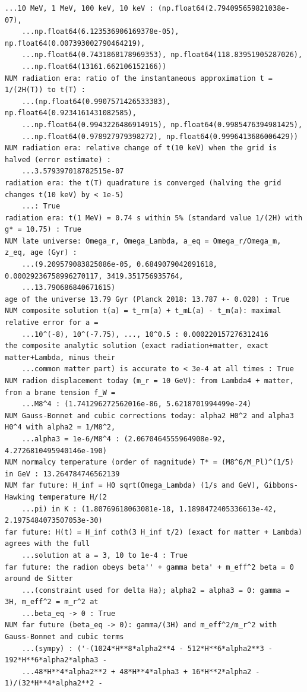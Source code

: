 \documentclass[10pt,a4paper]{article}
\begin{document}
\begin{Verbatim}[fontsize=\small,frame=single,framesep=2mm]
    ...10 MeV, 1 MeV, 100 keV, 10 keV : (np.float64(2.794095659821038e-07),
    ...np.float64(6.123536906169378e-05), np.float64(0.007393002790464219),
    ...np.float64(0.7431868178969353), np.float64(118.83951905287026),
    ...np.float64(13161.662106152166))
NUM radiation era: ratio of the instantaneous approximation t = 1/(2H(T)) to t(T) :
    ...(np.float64(0.9907571426533383), np.float64(0.9234161431082585),
    ...np.float64(0.9943226486914915), np.float64(0.9985476394981425),
    ...np.float64(0.978927979398272), np.float64(0.9996413686006429))
NUM radiation era: relative change of t(10 keV) when the grid is halved (error estimate) :
    ...3.579397018782515e-07
radiation era: the t(T) quadrature is converged (halving the grid changes t(10 keV) by < 1e-5)
    ...: True
radiation era: t(1 MeV) = 0.74 s within 5% (standard value 1/(2H) with g* = 10.75) : True
NUM late universe: Omega_r, Omega_Lambda, a_eq = Omega_r/Omega_m, z_eq, age (Gyr) :
    ...(9.209579083825086e-05, 0.6849079042091618, 0.00029236758996270117, 3419.351756935764,
    ...13.790686840671615)
age of the universe 13.79 Gyr (Planck 2018: 13.787 +- 0.020) : True
NUM composite solution t(a) = t_rm(a) + t_mL(a) - t_m(a): maximal relative error for a =
    ...10^(-8), 10^(-7.75), ..., 10^0.5 : 0.000220157276312416
the composite analytic solution (exact radiation+matter, exact matter+Lambda, minus their
    ...common matter part) is accurate to < 3e-4 at all times : True
NUM radion displacement today (m_r = 10 GeV): from Lambda4 + matter, from a brane tension f_W =
    ...M8^4 : (1.741296272562016e-86, 5.6218701994499e-24)
NUM Gauss-Bonnet and cubic corrections today: alpha2 H0^2 and alpha3 H0^4 with alpha2 = 1/M8^2,
    ...alpha3 = 1e-6/M8^4 : (2.0670464555964908e-92, 4.2726810495940146e-190)
NUM normalcy temperature (order of magnitude) T* = (M8^6/M_Pl)^(1/5) in GeV : 13.264784746562139
NUM far future: H_inf = H0 sqrt(Omega_Lambda) (1/s and GeV), Gibbons-Hawking temperature H/(2
    ...pi) in K : (1.80769618063081e-18, 1.1898472405336613e-42, 2.1975484073507053e-30)
far future: H(t) = H_inf coth(3 H_inf t/2) (exact for matter + Lambda) agrees with the full
    ...solution at a = 3, 10 to 1e-4 : True
far future: the radion obeys beta'' + gamma beta' + m_eff^2 beta = 0 around de Sitter
    ...(constraint used for delta Ha); alpha2 = alpha3 = 0: gamma = 3H, m_eff^2 = m_r^2 at
    ...beta_eq -> 0 : True
NUM far future (beta_eq -> 0): gamma/(3H) and m_eff^2/m_r^2 with Gauss-Bonnet and cubic terms
    ...(sympy) : ('-(1024*H**8*alpha2**4 - 512*H**6*alpha2**3 - 192*H**6*alpha2*alpha3 -
    ...48*H**4*alpha2**2 + 48*H**4*alpha3 + 16*H**2*alpha2 - 1)/(32*H**4*alpha2**2 -

\end{Verbatim}
\end{document}
